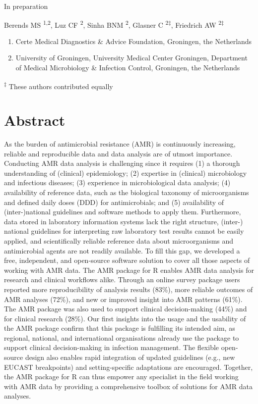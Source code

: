 \documentclass[
]{book}
\providecommand{\tightlist}{%
  \setlength{\itemsep}{0pt}\setlength{\parskip}{0pt}}
\begin{document}
In preparation

Berends MS \textsuperscript{1,2}, Luz CF \textsuperscript{2}, Sinha BNM \textsuperscript{2}, Glasner C \textsuperscript{2‡}, Friedrich AW \textsuperscript{2‡}

\begin{enumerate}
\def\labelenumi{\arabic{enumi}.}
\tightlist
\item
  Certe Medical Diagnostics \& Advice Foundation, Groningen, the Netherlands
\item
  University of Groningen, University Medical Center Groningen, Department of Medical Microbiology \& Infection Control, Groningen, the Netherlands
\end{enumerate}

\textsuperscript{‡} These authors contributed equally

\hypertarget{abstract-1}{%
\section*{Abstract}\label{abstract-1}}

As the burden of antimicrobial resistance (AMR) is continuously increasing, reliable and reproducible data and data analysis are of utmost importance. Conducting AMR data analysis is challenging since it requires (1) a thorough understanding of (clinical) epidemiology; (2) expertise in (clinical) microbiology and infectious diseases; (3) experience in microbiological data analysis; (4) availability of reference data, such as the biological taxonomy of microorganisms and defined daily doses (DDD) for antimicrobials; and (5) availability of (inter-)national guidelines and software methods to apply them. Furthermore, data stored in laboratory information systems lack the right structure, (inter-) national guidelines for interpreting raw laboratory test results cannot be easily applied, and scientifically reliable reference data about microorganisms and antimicrobial agents are not readily available. To fill this gap, we developed a free, independent, and open-source software solution to cover all those aspects of working with AMR data. The AMR package for R enables AMR data analysis for research and clinical workflows alike. Through an online survey package users reported more reproducibility of analysis results (83\%), more reliable outcomes of AMR analyses (72\%), and new or improved insight into AMR patterns (61\%). The AMR package was also used to support clinical decision-making (44\%) and for clinical research (28\%). Our first insights into the usage and the usability of the AMR package confirm that this package is fulfilling its intended aim, as regional, national, and international organisations already use the package to support clinical decision-making in infection management. The flexible open-source design also enables rapid integration of updated guidelines (e.g., new EUCAST breakpoints) and setting-specific adaptations are encouraged. Together, the AMR package for R can thus empower any specialist in the field working with AMR data by providing a comprehensive toolbox of solutions for AMR data analyses.
\end{document}
